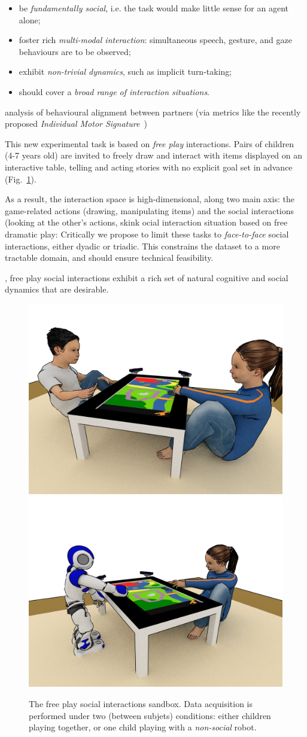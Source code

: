 \documentclass{article}
\newcommand{\ie}{i.e.\xspace}
\begin{document}
\begin{itemize}
    \item be \textit{fundamentally social}, \ie the task would make little sense for an
        agent alone;
    \item foster rich \textit{multi-modal interaction}: simultaneous speech, gesture, and gaze
        behaviours are to be observed;
    \item exhibit \textit{non-trivial dynamics}, such as implicit turn-taking;
    \item should cover a \textit{broad range of interaction situations}.
\end{itemize}

analysis of behavioural alignment between partners (via
metrics like the recently proposed \emph{Individual Motor
Signature}~\cite{slowinski2016dynamic})

This new experimental task is based on \emph{free play} interactions. Pairs of
children (4-7 years old) are invited to freely draw and interact with items
displayed on an interactive table, telling and acting stories with no explicit
goal set in advance (Fig.~\ref{fig|setup}).

As a result, the interaction space is high-dimensional, along two main axis: the
game-related actions (drawing, manipulating items) and the social interactions
(looking at the other's actions, skink
ocial interaction situation based on
free dramatic play: 
Critically we propose to limit these tasks to
\emph{face-to-face} social interactions, either dyadic or triadic. This constrains the dataset to
a more tractable domain, and should ensure technical feasibility. 




, free play social
interactions exhibit a rich set of natural cognitive and social dynamics that
are desirable.


\begin{figure}
    \centering
    \includegraphics[width=0.4\linewidth]{setup-child-child.png}
    \hspace{1em}
    \includegraphics[width=0.4\linewidth]{setup-child-robot.png}
    \caption{The free play social interactions sandbox. Data acquisition is
    performed under two (between subjets) conditions: either children playing together, or one
    child playing with a \emph{non-social} robot.}
    \label{fig|setup}
\end{figure}
\end{document}
